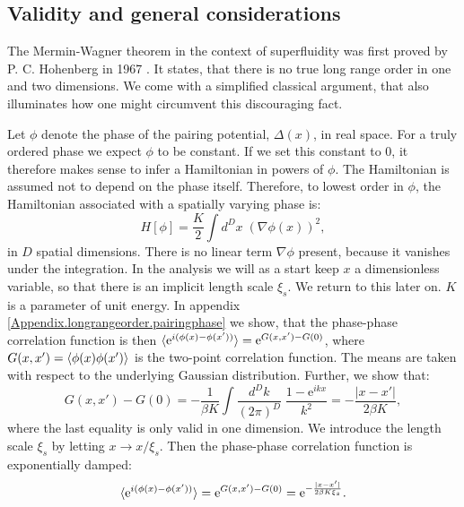 \subsection{Validity and general considerations} \label{subsec.meanfieldvalidity.general}
The Mermin-Wagner theorem in the context of superfluidity was first proved by P. C. Hohenberg in 1967 \cite{Hohenberg.MerminWagnertheorem}. It states, that there is no true long range order in one and two dimensions. We come with a simplified classical argument, that also illuminates how one might circumvent this discouraging fact. 

Let $\phi$ denote the phase of the pairing potential, $\Delta(x)$, in real space. For a truly ordered phase we expect $\phi$ to be constant. If we set this constant to 0, it therefore makes sense to infer a Hamiltonian in powers of $\phi$. The Hamiltonian is assumed not to depend on the phase itself. Therefore, to lowest order in $\phi$, the Hamiltonian associated with a spatially varying phase is: 
\begin{equation}
H[\phi] = \frac{K}{2}\int d^{D}x \; \left(\nabla \phi(x)\right)^2, 
\label{eq.Hphi.maintext}
\end{equation}
in $D$ spatial dimensions. There is no linear term $\nabla \phi$ present, because it vanishes under the integration. In the analysis we will as a start keep $x$ a dimensionless variable, so that there is an implicit length scale $\xi_s$. We return to this later on. $K$ is a parameter of unit energy. In appendix \ref{Appendix.longrangeorder.pairingphase} we show, that the phase-phase correlation function is then $\braket{ \text{e}^{i(\phi(x)- \phi(x'))} } = \text{e}^{G(x,x') - G(0)}$, where $G(x,x') = \braket{\phi(x)\phi(x')}$ is the two-point correlation function. The means are taken with respect to the underlying Gaussian distribution. Further, we show that:
\begin{equation}
G(x,x') - G(0) = -\frac{1}{\beta K}\int \frac{d^{D}k}{(2\pi)^D}\; \frac{1 - \text{e}^{ikx}}{k^2} = -\frac{|x - x'|}{2\beta K}, \nonumber 
\end{equation}
where the last equality is only valid in one dimension. We introduce the length scale $\xi_s$ by letting $x \to x / \xi_s$. Then the phase-phase correlation function is exponentially damped: 
\begin{equation}
\braket{ \text{e}^{i(\phi(x)- \phi(x'))} } = \text{e}^{G(x,x') - G(0)} = \text{e}^{-\frac{|x - x'|}{2\beta K \xi_s}}. 
\label{eq.phasecorrelationfunction.onedimension.maintext} 
\end{equation}
